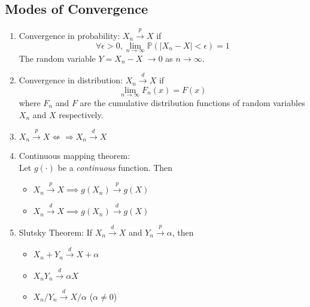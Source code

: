 \documentclass[%
 aip,
 jmp,%
 amsmath,amssymb,
 reprint,%
]{revtex4-1}
\newenvironment{note}{\color{gray}\footnotesize}{}
\def\P{\mathbb{P}}
\begin{document}
\subsection{Modes of Convergence}
\begin{enumerate}
  \item Convergence in probability: $X_n \overset{p}{\to} X$ if
    $$\forall\epsilon>0, \lim_{n\to\infty}\P(|X_n-X|<\epsilon)=1$$
    \begin{note}
      The random variable $Y=X_n-X$ $\to 0$ as $n\to\infty$.
    \end{note}

  \item Convergence in distribution: $X_n \overset{d}{\to} X$ if
    $$ \lim_{n\to\infty} F_n(x) = F(x)$$
  where $F_n$ and $F$ are the cumulative distribution functions of
  random variables $X_n$ and $X$ respectively.

  \item $X_n \overset{p}{\to} X \not\Leftarrow\Rightarrow X_n \overset{d}{\to} X$

  \item Continuous mapping theorem: \\
  Let $g(\cdot)$ be a \emph{continuous} function. Then
    \begin{itemize}
      \item $X_n \overset{p}{\to} X \implies g(X_n) \overset{p}{\to} g(X)$
      \item $X_n \overset{d}{\to} X \implies g(X_n) \overset{d}{\to} g(X)$
    \end{itemize}

  \item Slutsky Theorem: If $X_n \overset{d}{\to} X$ and $Y_n \overset{p}{\to} \alpha$, then
    \begin{itemize}
      \item $X_n + Y_n \overset{d}{\to} X + \alpha$
      \item $X_n Y_n \overset{d}{\to} \alpha X$
      \item $X_n/Y_n \overset{d}{\to} X/\alpha$ ($\alpha\neq 0$)\\
    \end{itemize}
\end{enumerate}
\end{document}
